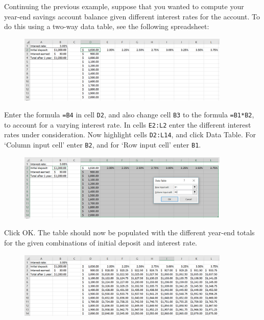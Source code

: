 \begin{myexample}\label{ex:3_datatable2}
Continuing the previous example, suppose that you wanted to compute your year-end savings account balance given different interest rates for the account.
To do this using a two-way data table, see the following spreadsheet:

\begin{figure}[htbp]
	\centering
	\includegraphics[width=0.9\textwidth]{fig/3_datatable2_1.png}
	\label{fig:3_datatable2_1}
\end{figure}

Enter the formula \texttt{=B4} in cell \texttt{D2}, and also change cell \texttt{B3} to the formula \texttt{=B1*B2}, to account for a varying interest rate.
In cells \texttt{E2:L2} enter the different interest rates under consideration.
Now highlight cells \texttt{D2:L14}, and click Data Table.
For `Column input cell' enter \texttt{B2}, and for `Row input cell' enter \texttt{B1}.

\begin{figure}[htbp]
	\centering
	\includegraphics[width=0.9\textwidth]{fig/3_datatable2_2.png}
	\label{fig:3_datatable2_2}
\end{figure}

Click OK.
The table should now be populated with the different year-end totals for the given combinations of initial deposit and interest rate.

\begin{figure}[htbp]
	\centering
	\includegraphics[width=0.9\textwidth]{fig/3_datatable2_3.png}
	\label{fig:3_datatable2_3}
\end{figure}


\end{myexample}

